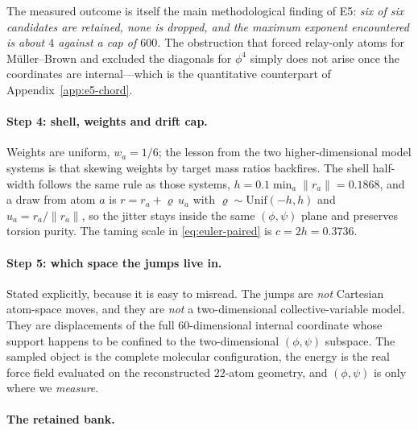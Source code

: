 \documentclass[11pt]{article}
\begin{document}
The measured outcome is itself the main methodological finding of E5: \emph{six
of six candidates are retained, none is dropped, and the maximum exponent
encountered is about $4$ against a cap of $600$.}  The obstruction that forced
relay-only atoms for M\"uller--Brown and excluded the diagonals for $\phi^4$
simply does not arise once the coordinates are internal---which is the
quantitative counterpart of Appendix~\ref{app:e5-chord}.

\paragraph{Step 4: shell, weights and drift cap.}
Weights are uniform, $w_a=1/6$; the lesson from the two higher-dimensional
model systems is that skewing weights by target mass ratios backfires.  The
shell half-width follows the same rule as those systems,
$h=0.1\min_a\lVert r_a\rVert=0.1868$, and a draw from atom $a$ is
$r=r_a+\varrho\,u_a$ with $\varrho\sim\mathrm{Unif}(-h,h)$ and $u_a=r_a/\lVert
r_a\rVert$, so the jitter stays inside the same $(\phi,\psi)$ plane and
preserves torsion purity.  The taming scale in \eqref{eq:euler-paired} is
$c=2h=0.3736$.

\paragraph{Step 5: which space the jumps live in.}
Stated explicitly, because it is easy to misread.  The jumps are \emph{not}
Cartesian atom-space moves, and they are \emph{not} a two-dimensional
collective-variable model.  They are displacements of the full
$60$-dimensional internal coordinate whose support happens to be confined to
the two-dimensional $(\phi,\psi)$ subspace.  The sampled object is the complete
molecular configuration, the energy is the real force field evaluated on the
reconstructed $22$-atom geometry, and $(\phi,\psi)$ is only where we
\emph{measure}.

\paragraph{The retained bank.}
\end{document}
